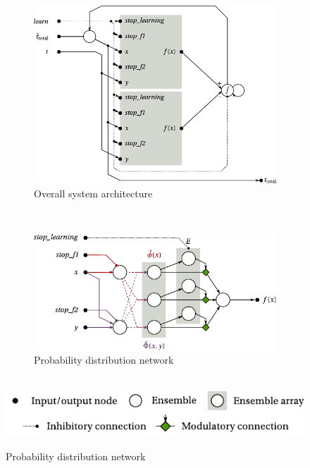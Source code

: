 \documentclass[a4paper,11pt]{article}
\begin{document}
\begin{figure}[p]
    \centering
    \begin{subfigure}{\textwidth}%
        \centering%
        \includegraphics{media/diag_overall.pdf}%
        \caption{Overall system architecture}
        \label{fig:diag_overall}
    \end{subfigure}\\[1cm]
    \begin{subfigure}{\textwidth}%
        \centering%
        \includegraphics{media/diag_px.pdf}%
        \caption{Probability distribution network}
        \label{fig:diag_px}
    \end{subfigure}\\[1cm]
    \includegraphics{media/diag_legend.pdf}\\[1cm]

\end{figure}
\end{document}
